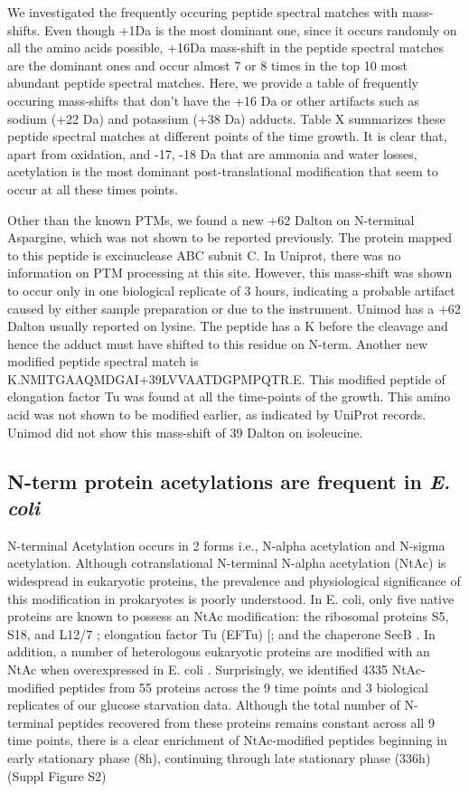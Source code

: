 \documentclass[12pt]{article}
\begin{document}
We investigated the frequently occuring peptide spectral matches with mass-shifts. Even though +1Da is the most dominant one, since it occurs randomly on all the amino acids possible, +16Da mass-shift in the peptide spectral matches are the dominant ones and occur almost 7 or 8 times in the top 10 most abundant peptide spectral matches. Here, we provide a table of frequently occuring mass-shifts that don't have the +16 Da or other artifacts such as sodium (+22 Da) and potassium (+38 Da) adducts. Table X summarizes these peptide spectral matches at different points of the time growth. It is clear that, apart from oxidation, and -17, -18 Da that are ammonia and water losses, acetylation is the most dominant post-translational modification that seem to occur at all these times points. 

Other than the known PTMs, we found a new +62 Dalton on N-terminal Aspargine, which was not shown to be reported previously. The protein mapped to this peptide is excinuclease ABC subnit C. In Uniprot, there was no information on PTM processing at this site. However, this mass-shift was shown to occur only in one biological replicate of 3 hours, indicating a probable artifact caused by either sample preparation or due to the instrument. Unimod has a +62 Dalton usually reported on lysine. The peptide has a K before the cleavage and hence the adduct must have shifted to this residue on N-term. Another new modified peptide spectral match is K.NMITGAAQMDGAI+39LVVAATDGPMPQTR.E. This modified peptide of elongation factor Tu was found at all the time-points of the growth. This amino acid was not shown to be modified earlier, as indicated by UniProt records. Unimod did not show this mass-shift of 39 Dalton on isoleucine.

\subsection{N-term protein acetylations are frequent in \emph{E. coli}}

N-terminal Acetylation occurs in 2 forms i.e., N-{alpha} acetylation and N-{sigma} acetylation. Although cotranslational N-terminal N-{alpha} acetylation (NtAc) is widespread in eukaryotic proteins, the prevalence and physiological significance of this modification in prokaryotes is poorly understood. In E. coli, only five native proteins are known to possess an NtAc modification: the ribosomal proteins S5, S18, and L12/7 \cite{Nesterchuketal2011}; elongation factor Tu (EFTu) [\cite{Araietal1980}; and the chaperone SecB  \cite{Smithetal1996}. In addition, a number of heterologous eukaryotic proteins are modified with an NtAc when overexpressed in E. coli  \cite{Bernal-Perezetal2012}\cite{Charbautetal2002}\cite{Wuetal2006}\cite{Miaoetal2007}. Surprisingly, we identified 4335 NtAc-modified peptides from 55 proteins across the 9 time points and 3 biological replicates of our glucose starvation data. Although the total number of N-terminal peptides recovered from these proteins remains constant across all 9 time points, there is a clear enrichment of NtAc-modified peptides beginning in early stationary phase (8h), continuing through late stationary phase (336h) (Suppl Figure S2)
\end{document}

